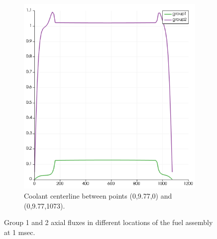 \documentclass[11pt,letterpaper]{article}
\begin{document}
\begin{figure}[htbp!]
\begin{subfigure}[t]{0.4\textwidth}
			\includegraphics[width=\linewidth]{3D-assembly2}
			\caption{Coolant centerline between points (0,9.77,0) and (0,9.77,1073).}
		\end{subfigure}
		\hfill
		\caption{Group 1 and 2 axial fluxes in different locations of the fuel assembly at 1 msec.}
		\label{fig:3D-assembly2}
	\end{figure}


\pagebreak

% 
\end{document}
